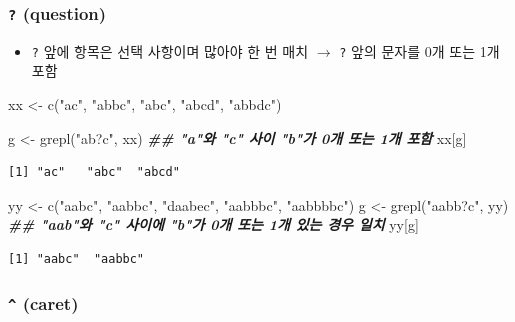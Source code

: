 \documentclass[
  11pt,
]{krantz}
\newenvironment{Shaded}{\begin{snugshade}}{\end{snugshade}}
\newcommand{\DocumentationTok}[1]{\textcolor[rgb]{0.37,0.37,0.37}{\textbf{\textit{#1}}}}
\newcommand{\FunctionTok}[1]{\textcolor[rgb]{0,0,0}{#1}}
\newcommand{\NormalTok}[1]{#1}
\newcommand{\OtherTok}[1]{\textcolor[rgb]{0.37,0.37,0.37}{#1}}
\newcommand{\StringTok}[1]{\textcolor[rgb]{0.5,0.5,0.5}{#1}}
\providecommand{\tightlist}{%
  \setlength{\itemsep}{0pt}\setlength{\parskip}{0pt}}
\begin{document}
\normalsize

\hypertarget{question}{%
\subsubsection*{\texorpdfstring{\textbf{\texttt{?} (question)}}{? (question)}}\label{question}}


\begin{itemize}
\tightlist
\item
  \texttt{?} 앞에 항목은 선택 사항이며 많아야 한 번 매치 \(\rightarrow\) \texttt{?} 앞의 문자를 0개 또는 1개 포함
\end{itemize}

\footnotesize

\begin{Shaded}
\begin{Highlighting}[]
\NormalTok{xx }\OtherTok{\textless{}{-}} \FunctionTok{c}\NormalTok{(}\StringTok{"ac"}\NormalTok{, }\StringTok{"abbc"}\NormalTok{, }\StringTok{"abc"}\NormalTok{, }\StringTok{"abcd"}\NormalTok{, }\StringTok{"abbdc"}\NormalTok{)}

\NormalTok{g }\OtherTok{\textless{}{-}} \FunctionTok{grepl}\NormalTok{(}\StringTok{"ab?c"}\NormalTok{, xx) }\DocumentationTok{\#\# "a"와 "c" 사이 "b"가 0개 또는 1개 포함}
\NormalTok{xx[g]}
\end{Highlighting}
\end{Shaded}

\begin{verbatim}
[1] "ac"   "abc"  "abcd"
\end{verbatim}

\begin{Shaded}
\begin{Highlighting}[]
\NormalTok{yy }\OtherTok{\textless{}{-}} \FunctionTok{c}\NormalTok{(}\StringTok{"aabc"}\NormalTok{, }\StringTok{"aabbc"}\NormalTok{, }\StringTok{"daabec"}\NormalTok{, }\StringTok{"aabbbc"}\NormalTok{, }\StringTok{"aabbbbc"}\NormalTok{)}
\NormalTok{g }\OtherTok{\textless{}{-}} \FunctionTok{grepl}\NormalTok{(}\StringTok{"aabb?c"}\NormalTok{, yy) }\DocumentationTok{\#\# "aab"와 "c" 사이에 "b"가 0개 또는 1개 있는 경우 일치}
\NormalTok{yy[g]}
\end{Highlighting}
\end{Shaded}

\begin{verbatim}
[1] "aabc"  "aabbc"
\end{verbatim}

\normalsize

\hypertarget{caret}{%
\subsubsection*{\texorpdfstring{\textbf{\texttt{\^{}} (caret)}}{\^{} (caret)}}\label{caret}}
\end{document}
